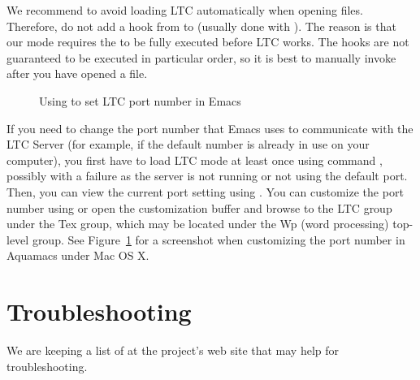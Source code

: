 We recommend to avoid loading LTC automatically when opening  files.  Therefore, do not add a hook from  to  (usually done with ).   The reason is that our mode requires the  to be fully executed before LTC works. The hooks are not guaranteed to be executed in particular order, so it is best to manually invoke  after you have opened a  file.

\begin{figure}[t]
\centering
{}
\caption{Using  to set LTC port number in Emacs} \label{fig:emacs-port}
\end{figure}

If you need to change the port number that Emacs uses to communicate with the LTC Server (for example, if the default number is already in use on your computer), you first have to load LTC mode at least once using command , possibly with a failure as the server is not running or not using the default port.  Then, you can view the current port setting using .  You can customize the port number using  or open the customization buffer and browse to the LTC group under the Tex group, which may be located under the Wp (word processing) top-level group.  See Figure~\ref{fig:emacs-port} for a screenshot when customizing the port number in Aquamacs under Mac OS X.

%

\section{Troubleshooting}

We are keeping a list of  at the project's web site that may help for troubleshooting.
